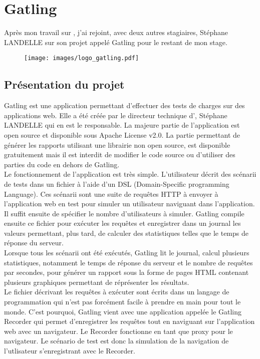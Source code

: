\section{Gatling}

Après mon travail sur \capico{}, j'ai rejoint, avec deux autres stagiaires, Stéphane LANDELLE sur son projet appelé Gatling \cite{gatling} pour le restant de mon stage.

\begin{figure}[H]
 \centering
 \texttt{[image: images/logo\_gatling.pdf]}
\end{figure}


\subsection{Présentation du projet}

Gatling est une application permettant d'effectuer des tests de charges sur des applications web. Elle a été créée par le directeur technique d'\ebi{}, Stéphane LANDELLE qui en est le responsable. La majeure partie de l'application est open source et disponible sous Apache License v2.0. La partie permettant de générer les rapports utilisant une librairie non open source, est disponible gratuitement mais il est interdit de modifier le code source ou d'utiliser des parties du code en dehors de Gatling.\\

Le fonctionnement de l'application est très simple. L'utilisateur décrit des scénarii de tests dans un fichier à l'aide d'un DSL (Domain-Specific programming Language). Ces scénarii sont une suite de requêtes HTTP à envoyer à l'application web en test pour simuler un utilisateur naviguant dans l'application. Il suffit ensuite de spécifier le nombre d'utilisateurs à simuler. Gatling compile ensuite ce fichier pour exécuter les requêtes et enregistrer dans un journal les valeurs permettant, plus tard, de calculer des statistiques telles que le temps de réponse du serveur.\\

Lorsque tous les scénarii ont été exécutés, Gatling lit le journal, calcul plusieurs statistiques, notamment le temps de réponse du serveur et le nombre de requêtes par secondes, pour générer un rapport sous la forme de pages HTML contenant plusieurs graphiques permettant de réprésenter les résultats.\\

Le fichier décrivant les requêtes à exécuter sont écrits dans un langage de programmation qui n'est pas forcément facile à prendre en main pour tout le monde. C'est pourquoi, Gatling vient avec une application appelée le Gatling Recorder qui permet d'enregistrer les requêtes tout en naviguant sur l'application web avec un navigateur. Le Recorder fonctionne en tant que proxy pour le navigateur. Le scénario de test est donc la simulation de la navigation de l'utlisateur s'enregistrant avec le Recorder.\\

